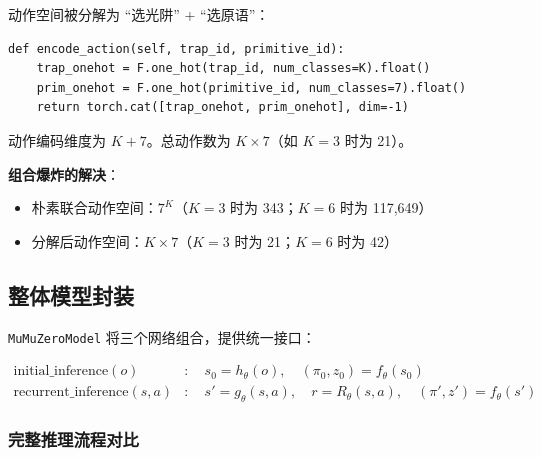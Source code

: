 \documentclass[UTF8, a4paper]{ctexart}
\begin{document}
动作空间被分解为 ``选光阱'' + ``选原语''：
\begin{lstlisting}
def encode_action(self, trap_id, primitive_id):
    trap_onehot = F.one_hot(trap_id, num_classes=K).float()
    prim_onehot = F.one_hot(primitive_id, num_classes=7).float()
    return torch.cat([trap_onehot, prim_onehot], dim=-1)
\end{lstlisting}

动作编码维度为 $K + 7$。总动作数为 $K \times 7$（如 $K=3$ 时为 21）。

\textbf{组合爆炸的解决}：
\begin{itemize}[leftmargin=2em]
    \item 朴素联合动作空间：$7^K$（$K=3$ 时为 343；$K=6$ 时为 117,649）
    \item 分解后动作空间：$K \times 7$（$K=3$ 时为 21；$K=6$ 时为 42）
\end{itemize}

\subsection{整体模型封装}

\texttt{MuMuZeroModel} 将三个网络组合，提供统一接口：

\begin{align}
\text{initial\_inference}(o) &:\quad s_0 = h_\theta(o), \quad (\pi_0, z_0) = f_\theta(s_0) \\
\text{recurrent\_inference}(s, a) &:\quad s' = g_\theta(s, a), \quad r = R_\theta(s, a), \quad (\pi', z') = f_\theta(s')
\end{align}

\subsubsection{完整推理流程对比}
\end{document}
